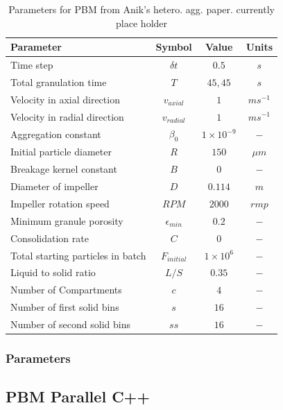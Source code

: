 \documentclass[preprint,11pt,authoryear]{elsarticle}
\begin{document}
	\begin{table}[!htb]
	\caption{Parameters for PBM from Anik's hetero. agg. paper. currently place holder} \label{table:mthds_pbm_parameters}
	\begin{center}
	\begin{tabular}{l|c|c|c}
	\hline
	\bf{Parameter} &\bf{Symbol} &\bf{Value} &\bf{Units}\\
	\hline
	Time step & $\delta t$ & $0.5$ & $s$\\
	Total granulation time & $T$ & $45, 45$ & $s$\\
	Velocity in axial direction & $v_{axial}$ & $1$ & $ms^{-1}$\\
	Velocity in radial direction & $v_{radial}$ & $1$ & $ms^{-1}$\\
	Aggregation constant & $\beta_0$ & $1\times10^{-9}$ & $-$\\
	Initial particle diameter & $R$ & $150$ & $\mu m$\\
	Breakage kernel constant & $B$ & $0$ & $-$\\
	Diameter of impeller & $D$ & $0.114$ & $m$ \\
	Impeller rotation speed & $RPM$ & $2000$ & $rmp$\\
	Minimum granule porosity & $\epsilon_{min}$ & $0.2$ & $-$\\
	Consolidation rate & $C$ & $0$ & $-$\\
	Total starting particles in batch & $F_{initial}$ & $1 \times 10^{6}$ & $-$\\
	Liquid to solid ratio & $L/S$ & $0.35$ & $-$ \\
	Number of Compartments & $c$ & $4$ & $-$ \\
	Number of first solid bins & $s$ & $16$ & $-$\\
	Number of second solid bins & $ss$ & $16$ & $-$\\
	\hline
	\end{tabular}
	\end{center}
	\end{table}
	
	    \subsubsection{Parameters}
	    
	    
	  \subsection{PBM Parallel C++}
\end{document}
